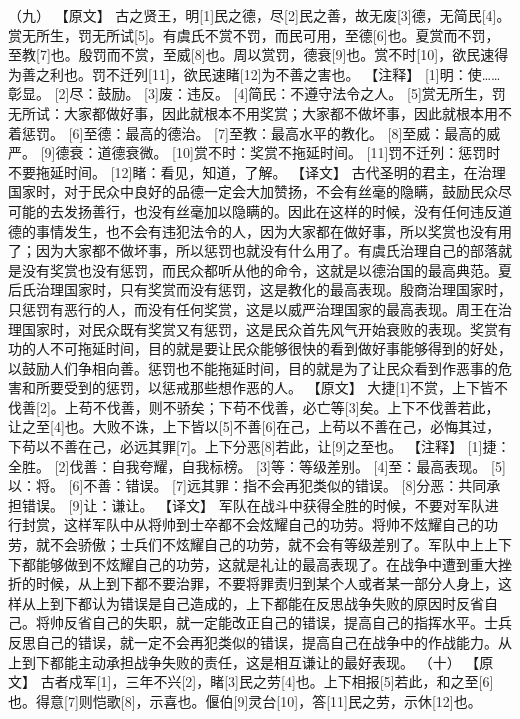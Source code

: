 \documentclass[a4paper,12pt,UTF8,twoside]{ctexbook}
\begin{document}
（九）
【原文】
古之贤王，明[1]民之德，尽[2]民之善，故无废[3]德，无简民[4]。赏无所生，罚无所试[5]。有虞氏不赏不罚，而民可用，至德[6]也。夏赏而不罚，至教[7]也。殷罚而不赏，至威[8]也。周以赏罚，德衰[9]也。赏不时[10]，欲民速得为善之利也。罚不迁列[11]，欲民速睹[12]为不善之害也。
【注释】
[1]明：使……彰显。
[2]尽：鼓励。
[3]废：违反。
[4]简民：不遵守法令之人。
[5]赏无所生，罚无所试：大家都做好事，因此就根本不用奖赏；大家都不做坏事，因此就根本用不着惩罚。
[6]至德：最高的德治。
[7]至教：最高水平的教化。
[8]至威：最高的威严。
[9]德衰：道德衰微。
[10]赏不时：奖赏不拖延时间。
[11]罚不迁列：惩罚时不要拖延时间。
[12]睹：看见，知道，了解。
【译文】
古代圣明的君主，在治理国家时，对于民众中良好的品德一定会大加赞扬，不会有丝毫的隐瞒，鼓励民众尽可能的去发扬善行，也没有丝毫加以隐瞒的。因此在这样的时候，没有任何违反道德的事情发生，也不会有违犯法令的人，因为大家都在做好事，所以奖赏也没有用了；因为大家都不做坏事，所以惩罚也就没有什么用了。有虞氏治理自己的部落就是没有奖赏也没有惩罚，而民众都听从他的命令，这就是以德治国的最高典范。夏后氏治理国家时，只有奖赏而没有惩罚，这是教化的最高表现。殷商治理国家时，只惩罚有恶行的人，而没有任何奖赏，这是以威严治理国家的最高表现。周王在治理国家时，对民众既有奖赏又有惩罚，这是民众首先风气开始衰败的表现。奖赏有功的人不可拖延时间，目的就是要让民众能够很快的看到做好事能够得到的好处，以鼓励人们争相向善。惩罚也不能拖延时间，目的就是为了让民众看到作恶事的危害和所要受到的惩罚，以惩戒那些想作恶的人。
【原文】
大捷[1]不赏，上下皆不伐善[2]。上苟不伐善，则不骄矣；下苟不伐善，必亡等[3]矣。上下不伐善若此，让之至[4]也。大败不诛，上下皆以[5]不善[6]在己，上苟以不善在己，必悔其过，下苟以不善在己，必远其罪[7]。上下分恶[8]若此，让[9]之至也。
【注释】
[1]捷：全胜。
[2]伐善：自我夸耀，自我标榜。
[3]等：等级差别。
[4]至：最高表现。
[5]以：将。
[6]不善：错误。
[7]远其罪：指不会再犯类似的错误。
[8]分恶：共同承担错误。
[9]让：谦让。
【译文】
军队在战斗中获得全胜的时候，不要对军队进行封赏，这样军队中从将帅到士卒都不会炫耀自己的功劳。将帅不炫耀自己的功劳，就不会骄傲；士兵们不炫耀自己的功劳，就不会有等级差别了。军队中上上下下都能够做到不炫耀自己的功劳，这就是礼让的最高表现了。在战争中遭到重大挫折的时候，从上到下都不要治罪，不要将罪责归到某个人或者某一部分人身上，这样从上到下都认为错误是自己造成的，上下都能在反思战争失败的原因时反省自己。将帅反省自己的失职，就一定能改正自己的错误，提高自己的指挥水平。士兵反思自己的错误，就一定不会再犯类似的错误，提高自己在战争中的作战能力。从上到下都能主动承担战争失败的责任，这是相互谦让的最好表现。
（十）
【原文】
古者戍军[1]，三年不兴[2]，睹[3]民之劳[4]也。上下相报[5]若此，和之至[6]也。得意[7]则恺歌[8]，示喜也。偃伯[9]灵台[10]，答[11]民之劳，示休[12]也。
\end{document}
